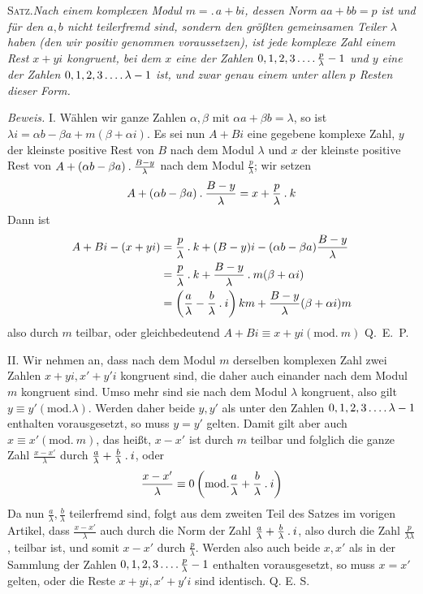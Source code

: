 \textsc{Satz.}\quad\emph{Nach einem komplexen Modul $m=.\,a+bi$, dessen Norm $aa+bb=p$ ist und für den $a,b$ nicht teilerfremd sind, sondern den größten gemeinsamen Teiler $\lambda$ haben (den wir positiv genommen voraussetzen), ist jede komplexe Zahl einem Rest $x+yi$ kongruent, bei dem $x$ eine der Zahlen $0,1,2,3\mathinner{.\,.\,.\,.}\frac p\lambda-1$ und $y$ eine der Zahlen $0,1,2,3\mathinner{.\,.\,.\,.}\lambda-1$ ist, und zwar genau einem unter allen $p$ Resten dieser Form.}

%
\emph{Beweis.} I. Wählen wir ganze Zahlen $\alpha,\beta$ mit $\alpha a+\beta b=\lambda$, so ist $\lambda i=\alpha b-\beta a+m(\beta+\alpha i)$. Es sei nun $A+Bi$ eine gegebene komplexe Zahl, $y$ der kleinste positive Rest von $B$ nach dem Modul $\lambda$ und $x$ der kleinste positive Rest von $A+(\alpha b-\beta a)\mathbin{.}\frac{B-y}{\lambda}$ nach dem Modul $\frac p\lambda$; wir setzen
\[
A+(\alpha b-\beta a)\mathbin{.}\frac{B-y}{\lambda}=x+\frac p\lambda\mathbin{.} k
\]
Dann ist
\[
\begin{aligned}
A+Bi-(x+yi)&=\frac p\lambda\mathbin{.} k+(B-y)i-(\alpha b-\beta a)\frac{B-y}{\lambda}\\
&=\frac p\lambda\mathbin{.} k+\frac{B-y}{\lambda}\mathbin{.} m(\beta+\alpha i)\\
&=\left(\frac a\lambda-\frac b\lambda\mathbin{.} i\right)km+\frac{B-y}{\lambda}(\beta+\alpha i)m
\end{aligned}
\]
also durch $m$ teilbar, oder gleichbedeutend $A+Bi\equiv x+yi(\mathrm{mod.}\ m)$ \mbox{Q. E. P.}

II. Wir nehmen an, dass nach dem Modul $m$ derselben komplexen Zahl zwei Zahlen $x+yi,x'+y'i$ kongruent sind, die daher auch einander nach dem Modul $m$ kongruent sind. Umso mehr sind sie nach dem Modul $\lambda$ kongruent, also gilt $y\equiv y'(\mathrm{mod.}\lambda)$. Werden daher beide $y,y'$ als unter den Zahlen $0,1,2,3\mathinner{.\,.\,.\,.}\lambda-1$ enthalten vorausgesetzt, so muss $y=y'$ gelten. Damit gilt aber auch $x\equiv x'(\mathrm{mod.}\ m)$, das heißt, $x-x'$ ist durch $m$ teilbar und folglich die ganze Zahl $\frac{x-x'}\lambda$ durch $\frac a\lambda+\frac b\lambda\mathbin{.} i$, oder
\[
\frac{x-x'}\lambda\equiv0\left(\mathrm{mod.}\frac a\lambda+\frac b\lambda\mathbin{.} i\right)
\]
Da nun $\frac a\lambda,\frac b\lambda$ teilerfremd sind, folgt aus dem zweiten Teil des Satzes im vorigen Artikel, dass $\frac{x-x'}\lambda$ auch durch die Norm der Zahl $\frac a\lambda+\frac b\lambda\mathbin{.} i$, also durch die Zahl $\frac p{\lambda\lambda}$, teilbar ist, und somit $x-x'$ durch $\frac p\lambda$. Werden also auch beide $x,x'$ als in der Sammlung der Zahlen $0,1,2,3\mathinner{.\,.\,.\,.}\frac p\lambda-1$ enthalten vorausgesetzt, so muss $x=x'$ gelten, oder die Reste $x+yi,x'+y'i$ sind identisch. Q. E. S.

